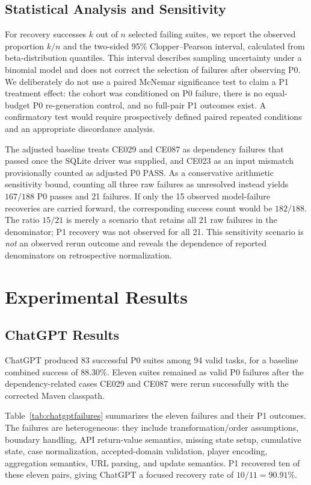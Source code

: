 \documentclass[conference]{IEEEtran}
\begin{document}
\subsection{Statistical Analysis and Sensitivity}
For recovery successes $k$ out of $n$ selected failing suites, we report the observed proportion $k/n$ and the two-sided 95\% Clopper--Pearson interval, calculated from beta-distribution quantiles. This interval describes sampling uncertainty under a binomial model and does not correct the selection of failures after observing P0. We deliberately do not use a paired McNemar significance test to claim a P1 treatment effect: the cohort was conditioned on P0 failure, there is no equal-budget P0 re-generation control, and no full-pair P1 outcomes exist. A confirmatory test would require prospectively defined paired repeated conditions and an appropriate discordance analysis.

The adjusted baseline treats CE029 and CE087 as dependency failures that passed once the SQLite driver was supplied, and CE023 as an input mismatch provisionally counted as adjusted P0 PASS. As a conservative arithmetic sensitivity bound, counting all three raw failures as unresolved instead yields $167/188$ P0 passes and 21 failures. If only the 15 observed model-failure recoveries are carried forward, the corresponding success count would be $182/188$. The ratio $15/21$ is merely a scenario that retains all 21 raw failures in the denominator; P1 recovery was not observed for all 21. This sensitivity scenario is \emph{not} an observed rerun outcome and reveals the dependence of reported denominators on retrospective normalization.

\section{Experimental Results}
\subsection{ChatGPT Results}
ChatGPT produced 83 successful P0 suites among 94 valid tasks, for a baseline combined success of 88.30\%. Eleven suites remained as valid P0 failures after the dependency-related cases CE029 and CE087 were rerun successfully with the corrected Maven classpath.

Table~\ref{tab:chatgptfailures} summarizes the eleven failures and their P1 outcomes. The failures are heterogeneous: they include transformation/order assumptions, boundary handling, API return-value semantics, missing state setup, cumulative state, case normalization, accepted-domain validation, player encoding, aggregation semantics, URL parsing, and update semantics. P1 recovered ten of these eleven pairs, giving ChatGPT a focused recovery rate of $10/11=90.91\%$.
\end{document}
